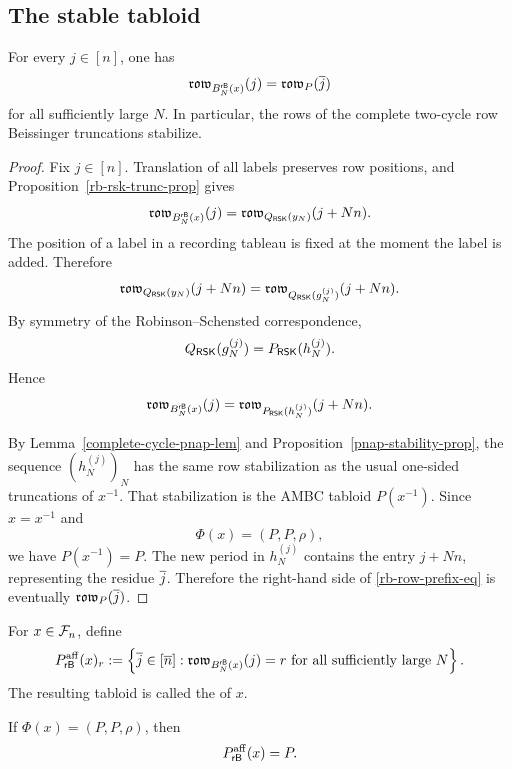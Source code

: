 \documentclass[11pt]{article}
\begin{document}
\subsection{The stable tabloid}

\begin{theorem}
\label{rb-ambc-tabloid-thm}
For every $j\in[n]$, one has
\[
\mathfrak{row}_{B^{\mathsf{rB}}_N(x)}(j)
=
\mathfrak{row}_P(\overline{j})
\]
for all sufficiently large $N$.  In particular, the rows of the complete
two-cycle row Beissinger truncations stabilize.
\end{theorem}

\begin{proof}
Fix $j\in[n]$.  Translation of all labels preserves row positions, and
Proposition~\ref{rb-rsk-trunc-prop} gives
\[
\mathfrak{row}_{B^{\mathsf{rB}}_N(x)}(j)
=
\mathfrak{row}_{Q_{\mathsf{RSK}}(y_N)}(j+Nn).
\]
The position of a label in a recording tableau is fixed at the moment the
label is added.  Therefore
\[
\mathfrak{row}_{Q_{\mathsf{RSK}}(y_N)}(j+Nn)
=
\mathfrak{row}_{Q_{\mathsf{RSK}}(g_N^{(j)})}(j+Nn).
\]
By symmetry of the Robinson--Schensted correspondence,
\[
Q_{\mathsf{RSK}}(g_N^{(j)})
=
P_{\mathsf{RSK}}(h_N^{(j)}).
\]
Hence
\begin{equation}
\label{rb-row-prefix-eq}
\mathfrak{row}_{B^{\mathsf{rB}}_N(x)}(j)
=
\mathfrak{row}_{P_{\mathsf{RSK}}(h_N^{(j)})}(j+Nn).
\end{equation}

By Lemma~\ref{complete-cycle-pnap-lem} and
Proposition~\ref{pnap-stability-prop}, the sequence
$(h_N^{(j)})_N$ has the same row stabilization as the usual one-sided
truncations of $x^{-1}$.  That stabilization is the AMBC tabloid
$P(x^{-1})$.  Since $x=x^{-1}$ and
\[
\Phi(x)=(P,P,\rho),
\]
we have $P(x^{-1})=P$.  The new period in $h_N^{(j)}$ contains the entry
$j+Nn$, representing the residue $\overline{j}$.  Therefore the right-hand side
of \eqref{rb-row-prefix-eq} is eventually $\mathfrak{row}_P(\overline{j})$.
\end{proof}

\begin{definition}
\label{affine-rb-tabloid-def}
For $x\in\mathcal F_n$, define
\[
P^{\mathrm{aff}}_{\mathsf{rB}}(x)_r
:=
\left\{
\overline{j}\in[\overline{n}]:
\mathfrak{row}_{B^{\mathsf{rB}}_N(x)}(j)=r
\text{ for all sufficiently large }N
\right\}.
\]
The resulting tabloid is called the 
of $x$.
\end{definition}

\begin{corollary}
\label{affine-rb-tabloid-cor}
If $\Phi(x)=(P,P,\rho)$, then
\[
P^{\mathrm{aff}}_{\mathsf{rB}}(x)=P.
\]
\end{corollary}
\end{document}
